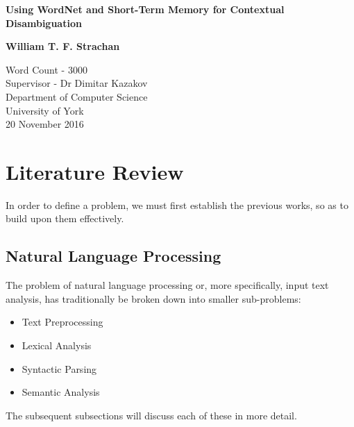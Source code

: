 \documentclass[twocolumn]{article}
\begin{document}
\begin{titlepage}
    \begin{center}
        \vspace*{1cm}
        
        \Huge
        \textbf{Using WordNet and Short-Term Memory for Contextual Disambiguation}
        \vspace{2cm}
        
        \Large
        \textbf{William T. F. Strachan}
        
        \vfill
                
        \vspace{0.8cm}
        
        \Large
        Word Count - 3000\\
        Supervisor - Dr Dimitar Kazakov\\
        Department of Computer Science\\
        University of York\\
        20 November 2016
        
    \end{center}
\end{titlepage}


\section{Literature Review}
\label{sec:LitReview}
In order to define a problem, we must first establish the previous works, so as to build upon them effectively. 

\subsection{Natural Language Processing}
\label{sec:NLP}
The problem of natural language processing or, more specifically, input text analysis, has traditionally be broken down into smaller sub-problems\cite{NLPHandbook}:
\begin{itemize}
	\item Text Preprocessing
	\item Lexical Analysis
	\item Syntactic Parsing
	\item Semantic Analysis
\end{itemize}
The subsequent subsections will discuss each of these in more detail.
\end{document}
